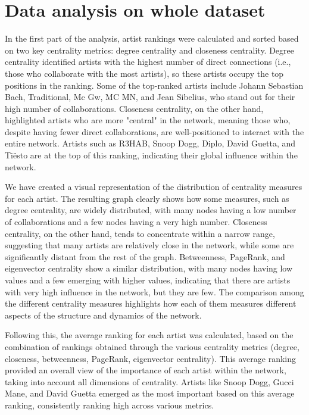 \section{Data analysis on whole dataset}
In the first part of the analysis, artist rankings were calculated and sorted based on two key centrality metrics: degree centrality and closeness centrality. Degree centrality identified artists with the highest number of direct connections (i.e., those who collaborate with the most artists), so these artists occupy the top positions in the ranking. Some of the top-ranked artists include Johann Sebastian Bach, Traditional, Mc Gw, MC MN, and Jean Sibelius, who stand out for their high number of collaborations. Closeness centrality, on the other hand, highlighted artists who are more "central" in the network, meaning those who, despite having fewer direct collaborations, are well-positioned to interact with the entire network. Artists such as R3HAB, Snoop Dogg, Diplo, David Guetta, and Tiësto are at the top of this ranking, indicating their global influence within the network.

We have created a visual representation of the distribution of centrality measures for each artist. The resulting graph clearly shows how some measures, such as degree centrality, are widely distributed, with many nodes having a low number of collaborations and a few nodes having a very high number. Closeness centrality, on the other hand, tends to concentrate within a narrow range, suggesting that many artists are relatively close in the network, while some are significantly distant from the rest of the graph. Betweenness, PageRank, and eigenvector centrality show a similar distribution, with many nodes having low values and a few emerging with higher values, indicating that there are artists with very high influence in the network, but they are few. The comparison among the different centrality measures highlights how each of them measures different aspects of the structure and dynamics of the network.

Following this, the average ranking for each artist was calculated, based on the combination of rankings obtained through the various centrality metrics (degree, closeness, betweenness, PageRank, eigenvector centrality). This average ranking provided an overall view of the importance of each artist within the network, taking into account all dimensions of centrality. Artists like Snoop Dogg, Gucci Mane, and David Guetta emerged as the most important based on this average ranking, consistently ranking high across various metrics.

